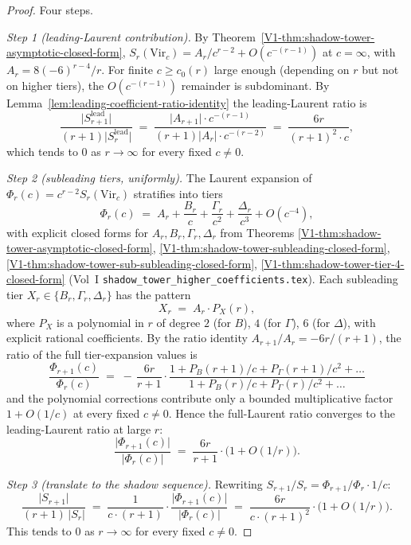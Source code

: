 \begin{proof}
Four steps.

\emph{Step 1 (leading-Laurent contribution).} By
Theorem~\ref{V1-thm:shadow-tower-asymptotic-closed-form},
$S_r(\mathrm{Vir}_c) = A_r / c^{r-2} + O(c^{-(r-1)})$ at $c = \infty$,
with $A_r = 8 (-6)^{r-4} / r$. For finite $c \ge c_0(r)$ large enough
(depending on $r$ but not on higher tiers), the $O(c^{-(r-1)})$
remainder is subdominant. By Lemma~\ref{lem:leading-coefficient-ratio-identity}
the leading-Laurent ratio is
\[
 \frac{\lvert S_{r+1}^{\mathrm{lead}} \rvert}
 {(r+1) \lvert S_r^{\mathrm{lead}} \rvert}
 \;=\;
 \frac{\lvert A_{r+1} \rvert \cdot c^{-(r-1)}}
 {(r+1) \lvert A_r \rvert \cdot c^{-(r-2)}}
 \;=\;
 \frac{6 r}{(r+1)^2 \cdot c},
\]
which tends to $0$ as $r \to \infty$ for every fixed $c \neq 0$.

\emph{Step 2 (subleading tiers, uniformly).} The Laurent expansion of
$\Phi_r(c) = c^{r-2} S_r(\mathrm{Vir}_c)$ stratifies into tiers
\[
 \Phi_r(c) \;=\; A_r + \frac{B_r}{c} + \frac{\Gamma_r}{c^2} +
 \frac{\Delta_r}{c^3} + O(c^{-4}),
\]
with explicit closed forms for $A_r, B_r, \Gamma_r, \Delta_r$ from
Theorems \ref{V1-thm:shadow-tower-asymptotic-closed-form},
\ref{V1-thm:shadow-tower-subleading-closed-form},
\ref{V1-thm:shadow-tower-sub-subleading-closed-form},
\ref{V1-thm:shadow-tower-tier-4-closed-form} (Vol~I
\texttt{shadow\_tower\_higher\_coefficients.tex}). Each subleading tier
$X_r \in \{B_r, \Gamma_r, \Delta_r\}$ has the pattern
\[
 X_r \;=\; A_r \cdot P_X(r),
\]
where $P_X$ is a polynomial in $r$ of degree $2$ (for $B$), $4$ (for
$\Gamma$), $6$ (for $\Delta$), with explicit rational coefficients. By
the ratio identity
$A_{r+1} / A_r = -6 r / (r+1)$, the ratio of the full tier-expansion
values is
\[
 \frac{\Phi_{r+1}(c)}{\Phi_r(c)}
 \;=\;
 -\,\frac{6 r}{r+1}
 \cdot
 \frac{1 + P_B(r+1)/c + P_\Gamma(r+1)/c^2 + \ldots}
 {1 + P_B(r)/c + P_\Gamma(r)/c^2 + \ldots}
\]
and the polynomial corrections contribute only a bounded
multiplicative factor $1 + O(1/c)$ at every fixed $c \neq 0$. Hence
the full-Laurent ratio converges to the leading-Laurent ratio at large
$r$:
\[
 \frac{\lvert \Phi_{r+1}(c) \rvert}{\lvert \Phi_r(c) \rvert}
 \;=\;
 \frac{6 r}{r+1}
 \cdot \bigl(1 + O(1/r)\bigr).
\]

\emph{Step 3 (translate to the shadow sequence).} Rewriting
$S_{r+1} / S_r = \Phi_{r+1} / \Phi_r \cdot 1/c$:
\[
 \frac{\lvert S_{r+1} \rvert}{(r+1)\,\lvert S_r \rvert}
 \;=\;
 \frac{1}{c \cdot (r+1)} \cdot
 \frac{\lvert \Phi_{r+1}(c) \rvert}{\lvert \Phi_r(c) \rvert}
 \;=\;
 \frac{6 r}{c \cdot (r+1)^2}
 \cdot \bigl(1 + O(1/r)\bigr).
\]
This tends to $0$ as $r \to \infty$ for every fixed $c \neq 0$.


\end{proof}
